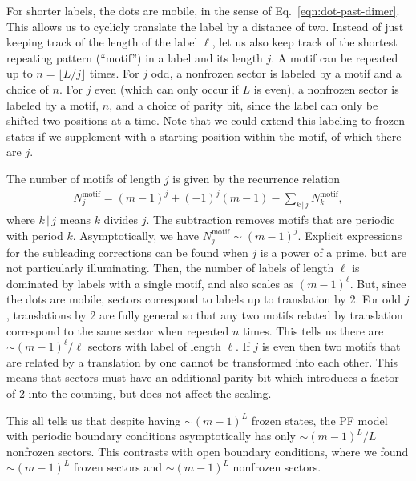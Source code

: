 For shorter labels, the dots are mobile, in the sense of Eq.~\eqref{eqn:dot-past-dimer}. This allows us to cyclicly translate the label by a distance of two. Instead of just keeping track of the length of the label $\ell$, let us also keep track of the shortest repeating pattern (``motif'') in a label and its length $j$. A motif can be repeated up to $n=\lfloor L/ j \rfloor$ times. For $j$ odd, a nonfrozen sector is labeled by a motif and a choice of $n$. For $j$ even (which can only occur if $L$ is even), a nonfrozen sector is labeled by a motif, $n$, and a choice of parity bit, since the label can only be shifted two positions at a time. Note that we could extend this labeling to frozen states if we supplement with a starting position within the motif, of which there are $j$.

The number of motifs of length $j$ is given by the recurrence relation
\begin{align}
    N^\text{motif}_j = (m-1)^j + (-1)^j(m-1) - \sum_{k \, | \, j} N^\text{motif}_k,
    \label{eqn:Nmotif}
\end{align}
where $k\, | \, j$ means $k$ divides $j$. The subtraction removes motifs that are periodic with period $k$. Asymptotically, we have $N^\text{motif}_j \sim (m-1)^j$. Explicit expressions for the subleading corrections can be found when $j$ is a power of a prime, but are not particularly illuminating. Then, the number of labels of length $\ell$ is dominated by labels with a single motif, and also scales as $(m-1)^\ell$. 
But, since the dots are mobile, sectors correspond to labels up to translation by 2. For odd $j$, translations by 2 are fully general so that any two motifs related by translation correspond to the same sector when repeated $n$ times. This tells us there are $\sim (m-1)^\ell/\ell$ sectors with label of length $\ell$. If $j$ is even then two motifs that are related by a translation by one cannot be transformed into each other. This means that sectors must have an additional parity bit which introduces a factor of 2 into the counting, but does not affect the scaling.

This all tells us that despite having $\sim (m-1)^L$ frozen states, the PF model with periodic boundary conditions asymptotically has only $\sim(m-1)^L/L$ nonfrozen sectors. This contrasts with open boundary conditions, where we found $\sim(m-1)^L$ frozen sectors and $\sim(m-1)^L$ nonfrozen sectors. 


